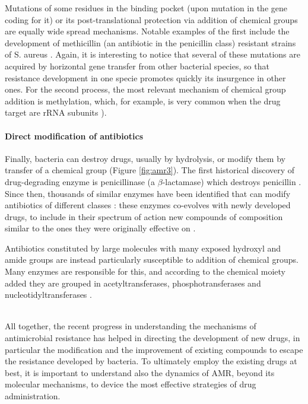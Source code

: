 Mutations of some residues in the binding pocket (upon mutation in the gene coding for it) or its post-translational protection via addition of chemical groups are equally wide spread mechanisms.
%
Notable examples of the first include the development of methicillin (an antibiotic in the penicillin class) resistant strains of S. aureus \citep{Shore2011,Billal2011}. Again, it is interesting to notice that several of these mutations are acquired by horizontal gene transfer from other bacterial species, so that resistance development in one specie promotes quickly its insurgence in other ones.
%
For the second process, the most relevant mechanism of chemical group addition is methylation, which, for example, is very common when the drug target are rRNA subunits \citep{Long2006}).


\paragraph{Direct modification of antibiotics}
Finally, bacteria can destroy drugs, usually by hydrolysis, or modify them by transfer of a chemical group (Figure \ref{fig:amr3}).
%
The first historical discovery of drug-degrading enzyme is penicillinase (a $\beta$-lactamase) which destroys penicillin \citep{Abraham1988,Lobanovska2017}. Since then, thousands of similar enzymes have been identified that can modify antibiotics of different classes \citep{Livermore2008,Nordmann2011}:
%
these enzymes co-evolves with newly developed drugs, to include in their spectrum of action new compounds of composition similar to the ones they were originally effective on \citep{Woodford2013}.

Antibiotics constituted by large molecules with many exposed hydroxyl and amide groups are instead particularly susceptible to addition of chemical groups. Many enzymes are responsible for this, and according to the chemical moiety added they are grouped in acetyltransferases, phosphotransferases and nucleotidyltransferases \citep{Wright2005}.

\hspace{0.5cm}
\\
All together, the recent progress in understanding the mechanisms of antimicrobial resistance has helped in directing the development of new drugs, in particular the modification and the improvement of existing compounds to escape the resistance developed by bacteria. To ultimately employ the existing drugs at best, it is important to understand also the dynamics of AMR, beyond its molecular mechanisms, to device the most effective strategies of drug administration.


